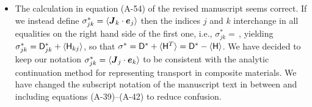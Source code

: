 \documentclass[amsa]{article}
\begin{document}
\begin{itemize}
\item The calculation in equation (A-54) of the revised manuscript
  seems correct. If we instead define $\sigma_{jk}^*=\langle \boldsymbol{J}_k\cdot\boldsymbol{e}_j\rangle$
  then the indices $j$ and $k$ interchange in all equalities on the
  right hand side of the first one, i.e., $\sigma^*_{jk}=\,$, yielding
  $\sigma^*_{jk}=\mathsf{D}^*_{jk}+\langle\mathsf{H}_{kj}\rangle$, so that
  $\sigma^*=\mathsf{D}^*+\langle\mathsf{H}^T\rangle=\mathsf{D}^*-\langle\mathsf{H}\rangle$. We have decided to keep our
  notation $\sigma_{jk}^*=\langle \boldsymbol{J}_j\cdot\boldsymbol{e}_k\rangle$ to be consistent with
  the analytic continuation method for representing transport in
  composite materials. We have 
  changed the subscript   notation of the manuscript text in between
  and including equations   (A-39)--(A-42) to reduce confusion.
\end{itemize}
\end{document}
